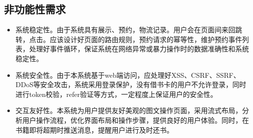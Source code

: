 \subsection{非功能性需求}
\begin{itemize}
    \item 系统稳定性。由于系统具有展示、预约，物流记录。用户会在页面间来回跳转，点击。应该设计好页面的路由规则，预约请求的幂等性，维护预约事件列表，处理好事件循环，保证系统在网络异常或暴力操作时的数据准确性和系统稳定性。
    \item 系统安全性。由于本系统基于web端访问，应处理好XSS、CSRF、SSRF、DDoS等安全攻击，系统采用登录保护，没有借书卡的用户不允许登录，同时进行token校验，refer验证等方式，一定程度上保证用户的安全性。
    \item 交互友好性。本系统为用户提供友好美观的图文操作页面，采用流式布局，分析用户操作流程，优化界面布局和操作步骤，提供良好的用户体验。同时，在书籍即将超期时推送消息，提醒用户进行及时还书。
\end{itemize}
